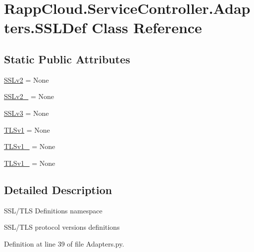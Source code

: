 \hypertarget{classRappCloud_1_1ServiceController_1_1Adapters_1_1SSLDef}{\section{Rapp\-Cloud.\-Service\-Controller.\-Adapters.\-S\-S\-L\-Def Class Reference}
\label{classRappCloud_1_1ServiceController_1_1Adapters_1_1SSLDef}
}
\subsection*{Static Public Attributes}
\begin{DoxyCompactItemize}
\item 
\hyperlink{classRappCloud_1_1ServiceController_1_1Adapters_1_1SSLDef_a703951a905c15b15e96d9c6a331b8a9d}{S\-S\-Lv2} = None
\item 
\hyperlink{classRappCloud_1_1ServiceController_1_1Adapters_1_1SSLDef_af6f35c9ef4bbe3d6b5e0bd824ed621b7}{S\-S\-Lv2\-\_} = None
\item 
\hyperlink{classRappCloud_1_1ServiceController_1_1Adapters_1_1SSLDef_a4d1d57c5f541acdeabb31001858d2df2}{S\-S\-Lv3} = None
\item 
\hyperlink{classRappCloud_1_1ServiceController_1_1Adapters_1_1SSLDef_ac6e06d0cfaa82d010ed8f5a5b41d3866}{T\-L\-Sv1} = None
\item 
\hyperlink{classRappCloud_1_1ServiceController_1_1Adapters_1_1SSLDef_a7dc8c96a780414e025f2e8ebe705d4cc}{T\-L\-Sv1\-\_} = None
\item 
\hyperlink{classRappCloud_1_1ServiceController_1_1Adapters_1_1SSLDef_ac7ebf831f22146b4be0d6d755d21d8da}{T\-L\-Sv1\-\_} = None
\end{DoxyCompactItemize}


\subsection{Detailed Description}
\begin{DoxyVerb}SSL/TLS Definitions namespace

SSL/TLS protocol versions definitions
\end{DoxyVerb}
 

Definition at line 39 of file Adapters.\-py.



